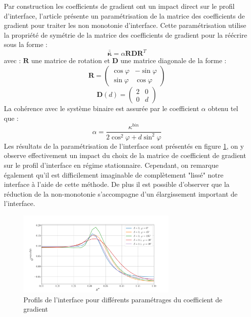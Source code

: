 Par construction les coefficients de gradient ont un impact direct sur le profil d'interface, l'article \cite{rasolofomanana_diffuse-interface_2022} présente un paramétrisation de la matrice des coefficients de gradient pour traiter les non monotonie d'interface. Cette paramétrisation utilise la propriété de symétrie de la matrice des coefficients de gradient pour la réécrire sous la forme :
\begin{equation}
\bar{\bar{\bm{\kappa}}} = \alpha \bm{R}\bm{D}\bm{R}^T
\label{eq:param_kappa}
\end{equation}
avec : $\bm{R}$ une matrice de rotation et $\bm{D}$ une matrice diagonale de la forme :
\begin{equation}
\bm{R} =    \begin{pmatrix} 
\cos\varphi & -\sin\varphi \\ 
\sin\varphi				&  \cos\varphi
\end{pmatrix}
\end{equation}
\begin{equation}
	\bm{D}(d) =    \begin{pmatrix} 
	2 & 0 \\ 
	0 & d
	\end{pmatrix} 
\end{equation}
La cohérence avec le système binaire est assurée par le coefficient $\alpha$ obtenu tel que :
\begin{equation}
\alpha = \frac{\kappa^{bin}}{2\cos^2\varphi + d \sin^2\varphi}
\end{equation}
Les résultats de la paramétrisation de l'interface sont présentés en figure \ref{fig:profinterfacekappa}, on y observe effectivement un impact du choix de la matrice de coefficient de gradient sur le profil d'interface en régime stationnaire. Cependant, on remarque également qu'il est difficilement imaginable de complètement "lissé" notre interface à l'aide de cette méthode. De plus il est possible d'observer que la réduction de la non-monotonie s'accompagne d'un élargissement important de l'interface.
\begin{figure}[H]
		\centering
		\includegraphics[width=0.7\textwidth]{figure/ProfInterfStatio2.png}
		\caption{Profils de l'interface pour différents paramétrages du coefficient de gradient}
		\label{fig:profinterfacekappa}
\end{figure}
